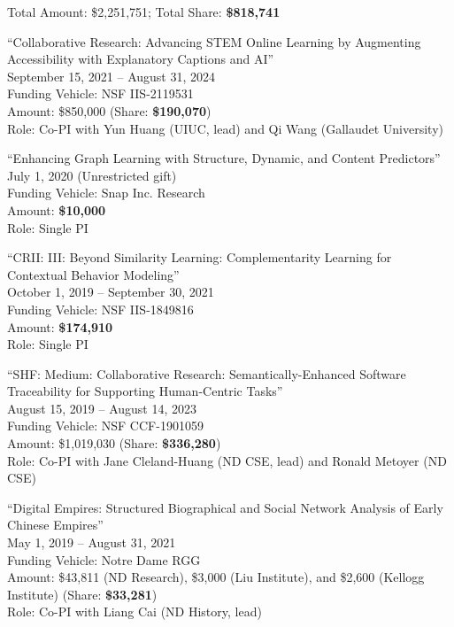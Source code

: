 \documentclass[10pt]{article}
\newenvironment{myindentpar}[1]%
{\begin{list}{}%
         {\setlength{\leftmargin}{#1}}%
         \item[]%
}
{\end{list}}
\newcounter{list}
\begin{document}
\begin{myindentpar}{0.75cm}

\hspace{-0.75cm} Total Amount: \$2,251,751; Total Share: \textbf{\$818,741}

\hspace{-0.75cm}``Collaborative Research: Advancing STEM Online Learning by Augmenting Accessibility with Explanatory Captions and AI''\\
September 15, 2021 -- August 31, 2024 \\
Funding Vehicle: NSF IIS-2119531 \\
Amount: \$850,000 (Share: \textbf{\$190,070}) \\
Role: {Co-PI} with Yun Huang (UIUC, lead) and Qi Wang (Gallaudet University)

\hspace{-0.75cm}``Enhancing Graph Learning with Structure, Dynamic, and Content Predictors''\\
July 1, 2020 (Unrestricted gift) \\
Funding Vehicle: Snap Inc. Research\\
Amount: \textbf{\$10,000} \\
Role: {Single PI}

\hspace{-0.75cm}``CRII: III: Beyond Similarity Learning: Complementarity Learning for Contextual Behavior Modeling''\\
October 1, 2019 -- September 30, 2021 \\
Funding Vehicle: NSF IIS-1849816 \\
Amount: \textbf{\$174,910} \\
Role: {Single PI}

\hspace{-0.75cm}``SHF: Medium: Collaborative Research: Semantically-Enhanced Software Traceability for Supporting Human-Centric Tasks''\\
August 15, 2019 -- August 14, 2023 \\
Funding Vehicle: NSF CCF-1901059 \\
Amount: \$1,019,030 (Share: \textbf{\$336,280}) \\
Role: {Co-PI} with Jane Cleland-Huang (ND CSE, lead) and Ronald Metoyer (ND CSE)

\hspace{-0.75cm}``Digital Empires: Structured Biographical and Social Network Analysis of Early Chinese Empires''\\
May 1, 2019 -- August 31, 2021 \\
Funding Vehicle: Notre Dame RGG \\
Amount: \$43,811 (ND Research), \$3,000 (Liu Institute), and \$2,600 (Kellogg Institute) (Share: \textbf{\$33,281}) \\
Role: {Co-PI} with Liang Cai (ND History, lead)


\end{myindentpar}
\end{document}
